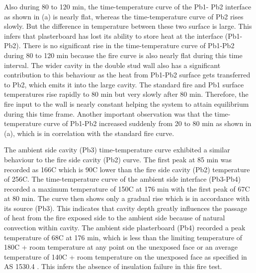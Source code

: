 Also during 80 to 120 min, the time-temperature curve of the Pb1- Pb2 interface as shown in  (a) is nearly flat, whereas the time-temperature curve of Pb2 rises slowly. But the difference in temperature between these two surface is large. This infers that plasterboard has lost its ability to store heat at the interface (Pb1-Pb2). There is no significant rise in the time-temperature curve of Pb1-Pb2 during 80 to 120 min because the fire curve is also nearly flat during this time interval. The wider cavity in the double stud wall also has a significant contribution to this behaviour as the heat from Pb1-Pb2 surface gets transferred to Pb2, which emits it into the large cavity. The standard fire and Pb1 surface temperatures rise rapidly to 80 min but very slowly after 80 min. Therefore, the fire input to the wall is nearly constant helping the system to attain equilibrium during this time frame. Another important observation was that the time-temperature curve of Pb1-Pb2 increased suddenly from 20 to 80 min as shown in  (a), which is in correlation with the standard fire curve.

The ambient side cavity (Pb3) time-temperature curve exhibited a similar behaviour to the fire side cavity (Pb2) curve. The first peak at 85 min was recorded as 166\degree C which is 90\degree C lower than the fire side cavity (Pb2) temperature of 256\degree C. The time-temperature curve of the ambient side interface (Pb3-Pb4) recorded a maximum temperature of 150\degree C at 176 min with the first peak of 67\degree C at 80 min. The curve then shows only a gradual rise which is in accordance with its source (Pb3). This indicates that cavity depth greatly influences the passage of heat from the fire exposed side to the ambient side because of natural convection within cavity. The ambient side plasterboard (Pb4) recorded a peak temperature of 68\degree C at 176 min, which is less than the limiting temperature of 180\degree C + room temperature at any point on the unexposed face or an average temperature of 140\degree C + room temperature on the unexposed face as specified in AS 1530.4 \citet{StandardsAustral2014}. This infers the absence of insulation failure in this fire test.

